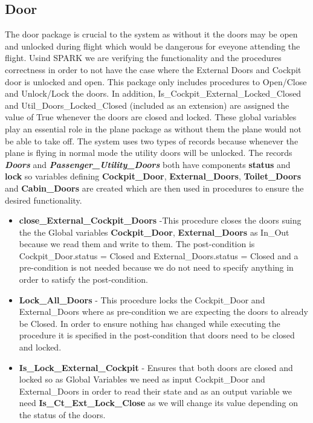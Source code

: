 \documentclass{llncs}
\begin{document}
\subsection{Door}
The door package is crucial to the system as without it the doors may be open and unlocked during flight which would be dangerous for eveyone attending the flight. Usind SPARK we are verifying the functionality and the procedures correctness in order to not have the case where the External Doors and Cockpit door is unlocked and open. 
This package only includes procedures to Open/Close and Unlock/Lock the doors. In addition, Is\_Cockpit\_External\_Locked\_Closed and Util\_Doors\_Locked\_Closed (included as an extension) are assigned the value of True whenever the doors are closed and locked. These global variables play an essential role in the plane package as without them the plane would not be able to take off. The system uses two types of records because whenever the plane is flying in normal mode the utility doors will be unlocked.
The records \textcolor{GreenViridis}{\textbf{\textit{Doors}}} and \textcolor{GreenViridis}{\textbf{\textit{Passenger\_Utility\_Doors}}} both have components \textcolor{BlueViridis}{\textbf{status}} and \textcolor{BlueViridis}{\textbf{lock}} so variables defining \textcolor{BlueViridis}{\textbf{Cockpit\_Door}}, \textcolor{BlueViridis}{\textbf{External\_Doors}}, \textcolor{BlueViridis}{\textbf{Toilet\_Doors}} and \textcolor{BlueViridis}{\textbf{Cabin\_Doors}} are created which are then used in procedures to ensure the desired functionality.  
\begin{itemize}
\item \textbf{close\_External\_Cockpit\_Doors} -This procedure closes the doors  suing the the Global variables \textcolor{BlueViridis}{\textbf{Cockpit\_Door}}, \textcolor{BlueViridis}{\textbf{External\_Doors}} as In\_Out because we read them and write to them. The post-condition is Cockpit\_Door.status = Closed and External\_Doors.status = Closed and a pre-condition is not needed because we do not need to specify anything in order to satisfy the post-condition. 
\item \textbf{Lock\_All\_Doors} - This procedure locks  the Cockpit\_Door and  External\_Doors where as pre-condition we are expecting the doors to already be Closed. In order to ensure nothing has changed while executing the procedure it is specified in the post-condition that doors need to be closed and locked. 
\item \textbf{Is\_Lock\_External\_Cockpit} -  Ensures that both doors are closed and locked so as Global Variables we need as input Cockpit\_Door and External\_Doors in order to read their state and as an output variable we need \textcolor{PurpleViridis}{\textbf{Is\_Ct\_Ext\_Lock\_Close}} as we will change its value depending on the status of the doors. 
\end{itemize}
\end{document}
